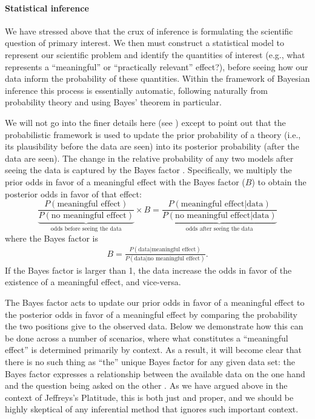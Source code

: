 \paragraph{Statistical inference} 
We have stressed above that the crux of inference is formulating the scientific question of primary interest. We then must construct a statistical model to represent our scientific problem and identify the quantities of interest (e.g., what represents a ``meaningful'' or ``practically relevant'' effect?), before seeing how our data inform the probability of these quantities. Within the framework of Bayesian inference this process is essentially automatic, following naturally from probability theory and using Bayes' theorem in particular. 

We will not go into the finer details here (see ) except to point out that the probabilistic framework is used to update the prior probability of a theory (i.e., its plausibility before the data are seen) into its posterior probability (after the data are seen). The change in the relative probability of any two models after seeing the data is captured by the Bayes factor \cite{Jeffreys1961}. Specifically, we multiply the prior odds in favor of a meaningful effect with the Bayes factor ($B$) to obtain the posterior odds in favor of that effect:
$$
\underbrace{\frac{P(\text{meaningful effect})}{P(\text{no meaningful effect})}}_\text{odds before seeing the data} \times {B}
=
\underbrace{\frac{P(\text{meaningful effect}|\text{data})}{P(\text{no meaningful effect}|\text{data})}}_\text{odds after seeing the data}
$$ 
where the Bayes factor is
\begin{eqnarray}\label{eq:b}
B = \frac{P(\text{data}|\text{meaningful effect})}{P(\text{data}|\text{no meaningful effect})}.
\end{eqnarray}%
If the Bayes factor is larger than 1, the data increase the odds in favor of the existence of a meaningful effect, and vice-versa.

The Bayes factor acts to update our prior odds in favor of a meaningful effect to the posterior odds in favor of a meaningful effect by comparing the probability the two positions give to the observed data. Below we demonstrate how this can be done across a number of scenarios, where what constitutes a ``meaningful effect'' is determined primarily by context. As a result, it will become clear that there is no such thing as ``the'' unique Bayes factor for any given data set: the Bayes factor expresses a relationship between the available data on the one hand and the question being asked on the other \cite{morey2011bayes}.  As we have argued above in the context of Jeffreys's Platitude, this is both just and proper, and we should 
be highly skeptical of any inferential method that ignores such important context.

